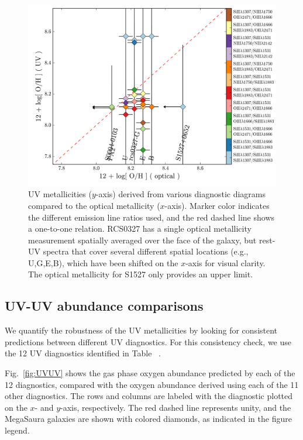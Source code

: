 \documentclass[preprint2]{aastex62}
\newcommand{\mage}{{\sc Meg}a{\sc S}a{\sc ura}\xspace}
\newcommand{\XXX}{{\bf \color{red}{XXX} }}
\begin{document}
\begin{figure}
  \begin{center}
    \includegraphics[width=\linewidth]{figs/f7.png}
    \caption{UV metallicities ($y$-axis) derived from various diagnostic diagrams compared to the optical metallicity ($x$-axis). Marker color indicates the different emission line ratios used, and the red dashed line shows a one-to-one relation. RCS0327 has a single optical metallicity measurement spatially averaged over the face of the galaxy, but rest-UV spectra that cover several different spatial locations (e.g., U,G,E,B), which have been shifted on the $x$-axis for visual clarity. The optical metallicity for S1527 only provides an upper limit.}
    \label{fig:UVZ}
  \end{center}
\end{figure}

\subsection{UV-UV abundance comparisons}\label{sec:UVOpt:UV}

We quantify the robustness of the UV metallicities by looking for consistent predictions between different UV diagnostics. For this consistency check, we use the 12 UV diagnostics identified in Table~\XXX.

Fig.~\ref{fig:UVUV} shows the gas phase oxygen abundance predicted by each of the 12 diagnostics, compared with the oxygen abundance derived using each of the 11 other diagnostics. The rows and columns are labeled with the diagnostic plotted on the $x$- and $y$-axis, respectively. The red dashed line represents unity, and the \mage galaxies are shown with colored diamonds, as indicated in the figure legend.
\end{document}
